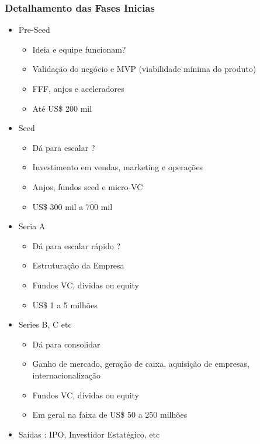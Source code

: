 \documentclass{sciposter}
\begin{document}
\begin{multicols}{3}
\subsubsection*{\textbf{Detalhamento das Fases Inicias}}
\begin{itemize}
    \item Pre-Seed \begin{itemize}
        \item Ideia e equipe funcionam?
        \item Validação do negócio e MVP (viabilidade mínima do produto)
        \item FFF, anjos e aceleradores
        \item Até US\$ 200 mil
        \end{itemize}
    \item Seed \begin{itemize}
        \item Dá para escalar ?
        \item Investimento em vendas, marketing e operações
        \item Anjos, fundos seed e micro-VC
        \item US\$ 300 mil a 700 mil
        \end{itemize}
    \item Seria A \begin{itemize}
        \item Dá para escalar rápido ?
        \item Estruturação da Empresa
        \item Fundos VC, dividas ou equity
        \item US\$ 1 a 5 milhões
        \end{itemize}
    \item Series B, C etc \begin{itemize}
        \item Dá para consolidar 
        \item Ganho de mercado, geração de caixa, aquisição de empresas, internacionalização
        \item Fundos VC, dívidas ou equity
        \item Em geral na faixa de US\$ 50 a 250 milhões
        \end{itemize}
    \item Saídas : IPO, Investidor Estatégico, etc 
\end{itemize}


\end{multicols}
\end{document}

